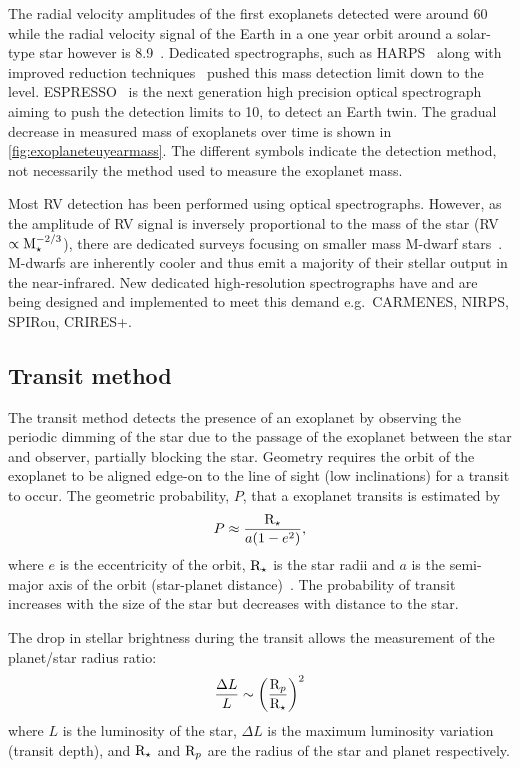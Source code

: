 The radial velocity amplitudes of the first exoplanets detected were around 60\mps{} while
the radial velocity signal of the Earth in a one year orbit around a solar-type star however is 8.9\cmps{}~\citep[e.g.][]{figueira_radial_2010}.
Dedicated spectrographs, such as HARPS~\citep{mayor_setting_2003} along with improved reduction techniques~\citep{lovis_new_2007} pushed this mass detection limit down to the \mps{} level.
ESPRESSO~\citep{pepe_espresso_2014, megevand_espresso_2014} is the next generation high precision optical spectrograph aiming to push the detection limits to 10\cmps, to detect an Earth twin.
The gradual decrease in measured mass of exoplanets over time is shown in \cref{fig:exoplaneteuyearmass}.
The different symbols indicate the detection method, not necessarily the method used to measure the exoplanet mass.

Most {RV} detection has been performed using optical spectrographs.
However, as the amplitude of {RV} signal is inversely proportional to the mass of the star ({RV} $\propto \textrm{M}_{\star}^{-2/3}$), there are dedicated surveys focusing on smaller mass M-dwarf stars~\citep[e.g.][]{reiners_carmenes_2018}.
M-dwarfs are inherently cooler and thus emit a majority of their stellar output in the near-infrared.
New dedicated high-resolution \nir{} spectrographs have and are being designed and implemented to meet this demand e.g.\ {CARMENES}, {NIRPS}, {SPIRou}, {CRIRES+}.


\subsection{Transit method}
\label{subsec:transit}
The transit method detects the presence of an exoplanet by observing the periodic dimming of the star due to the passage of the exoplanet between the star and observer, partially blocking the star.
Geometry requires the orbit of the exoplanet to be aligned edge-on to the line of sight (low inclinations) for a transit to occur.
The geometric probability, $P$, that a exoplanet transits is estimated by
\begin{equation}
P \approx \frac{\textrm{R}_{\star}}{a (1-{e}^{2})},
\end{equation}
where \(e\) is the eccentricity of the orbit, $\textrm{R}_{\star}$ is the star radii and \(a\) is the semi-major axis of the orbit (star-planet distance)~\citep[e.g.][]{barnes_effects_2007}.
The probability of transit increases with the size of the star but decreases with distance to the star.

The drop in stellar brightness during the transit allows the measurement of the planet/star radius ratio:
\begin{equation}
    \frac{\Delta L}{L}\sim{\left(\frac{\textrm{R}_{p}}{\textrm{R}_{\star}}\right)}^{2}
\end{equation}
where \(L\) is the luminosity of the star, \(\Delta L\) is the maximum luminosity variation (transit depth), and \(\textrm{R}_{\star}\) and \(\textrm{R}_{p}\) are the radius of the star and planet respectively.

